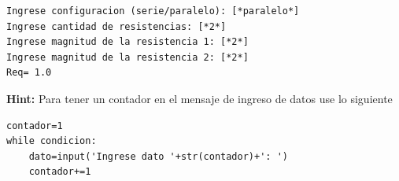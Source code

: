 \begin{lstlisting}[style=consola]
Ingrese configuracion (serie/paralelo): [*paralelo*]
Ingrese cantidad de resistencias: [*2*]
Ingrese magnitud de la resistencia 1: [*2*]
Ingrese magnitud de la resistencia 2: [*2*]
Req= 1.0
\end{lstlisting}
\textbf{Hint:} Para tener un contador en el mensaje de ingreso de datos use lo siguiente
\begin{lstlisting}[style=consola]
contador=1
while condicion:
    dato=input('Ingrese dato '+str(contador)+': ')
    contador+=1
\end{lstlisting}